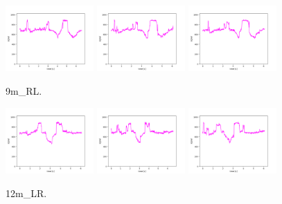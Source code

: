 \begin{figure}[!ht]
\begin{center}
\includegraphics[width=0.3\textwidth]{../data/9m_RL/9m_RL_1.png}
\includegraphics[width=0.3\textwidth]{../data/9m_RL/9m_RL_2.png}
\includegraphics[width=0.3\textwidth]{../data/9m_RL/9m_RL_3.png}
\caption{9m\_RL.\label{fig:9m_RL}}
\end{center}
\end{figure}

\begin{figure}[!ht]
\begin{center}
\includegraphics[width=0.3\textwidth]{../data/12m_LR/12m_LR_1.png}
\includegraphics[width=0.3\textwidth]{../data/12m_LR/12m_LR_2.png}
\includegraphics[width=0.3\textwidth]{../data/12m_LR/12m_LR_3.png}
\caption{12m\_LR.\label{fig:12m_LR}}
\end{center}
\end{figure}

